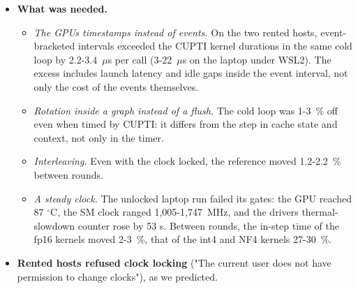 \documentclass[11pt,a4paper]{article}
\providecommand{\tightlist}{\setlength{\itemsep}{0pt}\setlength{\parskip}{0pt}}
\begin{document}
\begin{itemize}
\tightlist
\item
  \textbf{What was needed.}

  \begin{itemize}
  \tightlist
  \item
    \emph{The GPU\textquotesingle s timestamps instead of events.} On the two rented hosts, event-bracketed intervals exceeded the CUPTI
    kernel durations in the same cold loop by 2.2-3.4~\ensuremath{\mu}s per call (3-22~\ensuremath{\mu}s on the laptop under WSL2). The excess
    includes launch latency and idle gaps inside the event interval, not only the cost of the events themselves.
  \item
    \emph{Rotation inside a graph instead of a flush.} The cold loop was 1-3~\% off even when timed by CUPTI: it differs
    from the step in cache state and context, not only in the timer.
  \item
    \emph{Interleaving.} Even with the clock locked, the reference moved 1.2-2.2~\% between rounds.
  \item
    \emph{A steady clock.} The unlocked laptop run failed its gates: the GPU reached 87 \ensuremath{^\circ}C, the SM clock ranged
    1,005-1,747~MHz, and the driver\textquotesingle s thermal-slowdown counter rose by 53 s. Between rounds, the in-step time of the
    fp16 kernels moved 2-3~\%, that of the int4 and NF4 kernels 27-30~\%.
  \end{itemize}
\item
  \textbf{Rented hosts refused clock locking} ("The current user does not have permission to change clocks"), as we
  predicted.


\end{itemize}
\end{document}
